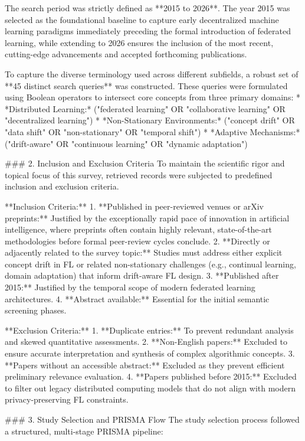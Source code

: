 \documentclass[journal]{IEEEtran}
\begin{document}
The search period was strictly defined as **2015 to 2026**. The year 2015 was selected as the foundational baseline to capture early decentralized machine learning paradigms immediately preceding the formal introduction of federated learning, while extending to 2026 ensures the inclusion of the most recent, cutting-edge advancements and accepted forthcoming publications. 

To capture the diverse terminology used across different subfields, a robust set of **45 distinct search queries** was constructed. These queries were formulated using Boolean operators to intersect core concepts from three primary domains: 
*   *Distributed Learning:* ("federated learning" OR "collaborative learning" OR "decentralized learning")
*   *Non-Stationary Environments:* ("concept drift" OR "data shift" OR "non-stationary" OR "temporal shift")
*   *Adaptive Mechanisms:* ("drift-aware" OR "continuous learning" OR "dynamic adaptation")

### 2. Inclusion and Exclusion Criteria
To maintain the scientific rigor and topical focus of this survey, retrieved records were subjected to predefined inclusion and exclusion criteria. 

**Inclusion Criteria:**
1.  **Published in peer-reviewed venues or arXiv preprints:** Justified by the exceptionally rapid pace of innovation in artificial intelligence, where preprints often contain highly relevant, state-of-the-art methodologies before formal peer-review cycles conclude.
2.  **Directly or adjacently related to the survey topic:** Studies must address either explicit concept drift in FL or related non-stationary challenges (e.g., continual learning, domain adaptation) that inform drift-aware FL design.
3.  **Published after 2015:** Justified by the temporal scope of modern federated learning architectures.
4.  **Abstract available:** Essential for the initial semantic screening phases.

**Exclusion Criteria:**
1.  **Duplicate entries:** To prevent redundant analysis and skewed quantitative assessments.
2.  **Non-English papers:** Excluded to ensure accurate interpretation and synthesis of complex algorithmic concepts.
3.  **Papers without an accessible abstract:** Excluded as they prevent efficient preliminary relevance evaluation.
4.  **Papers published before 2015:** Excluded to filter out legacy distributed computing models that do not align with modern privacy-preserving FL constraints.

### 3. Study Selection and PRISMA Flow
The study selection process followed a structured, multi-stage PRISMA pipeline:
\end{document}

